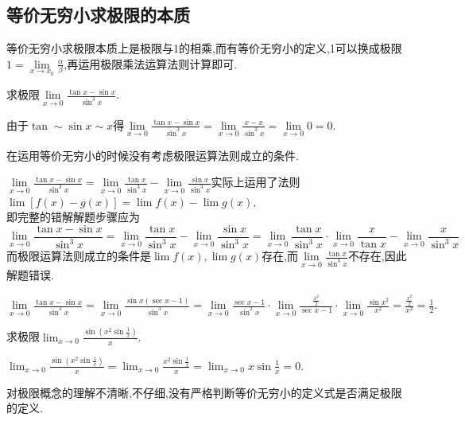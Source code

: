 \subsection{等价无穷小求极限的本质}
等价无穷小求极限本质上是极限与1的相乘,而有等价无穷小的定义,1可以换成极限$\displaystyle 1=\lim\limits_{x \to x_0}\frac{\alpha }{\beta}$,再运用极限乘法运算法则计算即可.

\example[等价无穷小的误用]\sj
\examples \label{例 1.8}求极限$\displaystyle \lim\limits_{x \to 0}\frac{\tan x -\sin x}{\sin^3 x}$.

\errsolve  由于$\tan \sim \sin x \sim x$得$\displaystyle \lim\limits_{x \to 0}\frac{\tan x -\sin x}{\sin^3 x}=\lim\limits_{x \to 0}\frac{x-x}{\sin^3 x}=\lim\limits_{x \to 0}0=0.$

\errreason  在运用等价无穷小的时候没有考虑极限运算法则成立的条件.

\solvereason $\displaystyle \lim\limits_{x \to 0}\frac{\tan x -\sin x}{\sin^3 x}=\lim\limits_{x \to 0}\frac{\tan x}{\sin^3 x} - \lim\limits_{x \to 0}\frac{\sin x}{\sin^3 x}$实际上运用了法则$\lim [f(x)-g(x)]=\lim f(x)-\lim g(x),$\\[1em]即完整的错解解题步骤应为
\begin{equation*}
\lim\limits_{x \to 0}\frac{\tan x -\sin x}{\sin^3 x}=\lim\limits_{x \to 0}\frac{\tan x}{\sin^3 x} - \lim\limits_{x \to 0}\frac{\sin x}{\sin^3 x}
=\lim\limits_{x \to 0}\frac{\tan x}{\sin^3 x}\cdot \lim\limits_{x \to 0} \frac{x}{\tan x}-\lim\limits_{x \to 0}\frac{x}{\sin^3 x}
\end{equation*}
而极限运算法则成立的条件是$\lim f(x),\lim g(x)$存在,而$\displaystyle \lim\limits_{x \to 0}\frac{\tan x}{\sin^3 x}$不存在,因此解题错误.

\solve $\displaystyle \lim\limits_{x \to 0}\frac{\tan x -\sin x}{\sin^3 x}=\lim\limits_{x \to 0}\frac{\sin x(\sec x-1)}{\sin^3 x}=\lim\limits_{x \to 0}\frac{\sec x-1}{\sin^2 x} \cdot \lim\limits_{x \to 0}\frac{\frac{x^2}{2}}{\sec x -1} \cdot \lim\limits_{x \to 0}\frac{\sin x^2}{x^2}
=\frac{\frac{x^2}{2}}{x^2}=\frac{1}{2}.$\jg

\examples 求极限$\displaystyle \lim_{x \to 0} \frac{\sin \left(x^2 \sin{\frac{1}{x}}\right) }{x}.$

\errsolve $\displaystyle \lim_{x \to 0}\frac{\sin \left(x^2 \sin{\frac{1}{x}}\right) }{x}=\lim_{x \to 0}\frac{x^2 \sin \frac{1}{x}}{x}=\lim_{x \to 0}x\sin\frac{1}{x}=0.$

\errreason 对极限概念的理解不清晰,不仔细,没有严格判断等价无穷小的定义式是否满足极限的定义.

